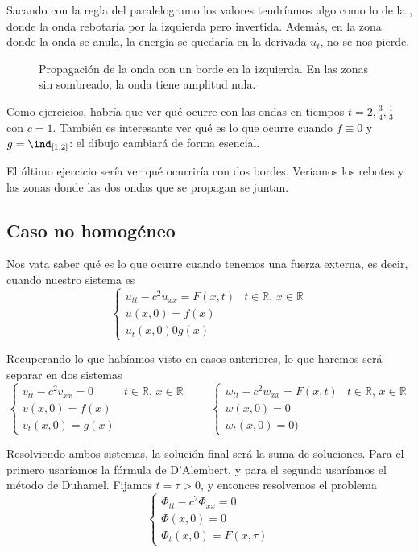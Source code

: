 		Sacando con la regla del paralelogramo los valores tendríamos algo como lo de la , donde la onda rebotaría por la izquierda pero invertida. Además, en la zona donde la onda se anula, la energía se quedaría en la derivada $u_t$, no se nos pierde.

		\begin{figure}[hbtp]
		\centering
		\caption{Propagación de la onda con un borde en la izquierda. En las zonas sin sombreado, la onda tiene amplitud nula.}
		\label{fig:OndaReflexion}
		\end{figure}


		Como ejercicios, habría que ver qué ocurre con las ondas en tiempos $t = 2, \frac{3}{4}, \frac{1}{3}$ con $c = 1$. También es interesante ver qué es lo que ocurre cuando $f \equiv 0$ y $g = \ind_{[1,2]}$: el dibujo cambiará de forma esencial.

		El último ejercicio sería ver qué ocurriría con dos bordes. Veríamos los rebotes y las zonas donde las dos ondas que se propagan se juntan.

		\subsection{Caso no homogéneo}

		Nos vata saber qué es lo que ocurre cuando tenemos una fuerza externa, es decir, cuando nuestro sistema es \[ \begin{cases}
		u_{tt} - c^2 u_{xx} = F(x,t) & t ∈ ℝ, \, x ∈ ℝ \\
		u(x,0) = f(x) \\
		u_t(x,0) 0 g(x) \end{cases}\]

		Recuperando lo que habíamos visto en casos anteriores, lo que haremos será separar en dos sistemas \[ \begin{cases}
		v_{tt} - c^2 v_{xx} =0  & t ∈ ℝ, \, x ∈ ℝ \\
		v(x,0) = f(x) \\
		v_t(x,0) = g(x) \end{cases} \qquad \begin{cases}
		w_{tt} - c^2 w_{xx} = F(x,t) & t ∈ ℝ, \, x ∈ ℝ \\
		w(x,0) = 0 \\
		w_t(x,0) = 0) \end{cases}\]

		Resolviendo ambos sistemas, la solución final será la suma de soluciones. Para el primero usaríamos la fórmula de D'Alembert, y para el segundo usaríamos el método de Duhamel. Fijamos $t = τ > 0$, y entonces resolvemos el problema \[ \begin{cases}
		Φ_{tt} - c^2 Φ_{xx} = 0 \\
		Φ(x,0) = 0 \\
		Φ_t(x,0) = F(x,τ) \end{cases}\]

